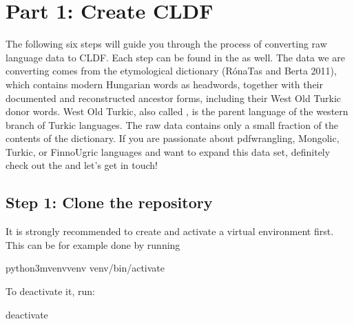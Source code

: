 \documentclass[letterpaper,10pt,english]{sphinxmanual}
\begin{document}
\chapter{Part 1: Create CLDF}
\label{\detokenize{mkcldf:part-1-create-cldf}}\label{\detokenize{mkcldf::doc}}
\sphinxAtStartPar
The following six steps will guide you through the process of
converting raw language data to CLDF. Each step can be found in the
as well. The data we are converting comes from the etymological dictionary
(Róna\sphinxhyphen{}Tas and Berta 2011),
which contains modern Hungarian words as headwords, together with their
documented and reconstructed ancestor forms, including their
West Old Turkic donor words. West Old Turkic, also called , is the parent
language of the western branch
of Turkic languages. The raw data contains only a small fraction of the
contents of the dictionary. If you are passionate about pdf\sphinxhyphen{}wrangling,
Mongolic, Turkic, or Finno\sphinxhyphen{}Ugric languages and want to expand this data set,
definitely check out the 
and let’s get in touch!


\section{Step 1: Clone the repository}
\label{\detokenize{mkcldf:step-1-clone-the-repository}}
\sphinxAtStartPar
It is strongly recommended to create and activate a virtual environment first.
This can be for example done by running

\begin{sphinxVerbatim}[commandchars=\\\{\}]
python3\PYGZhy{}mvenvvenv
venv/bin/activate
\end{sphinxVerbatim}

\sphinxAtStartPar
To deactivate it, run:

\begin{sphinxVerbatim}[commandchars=\\\{\}]
deactivate
\end{sphinxVerbatim}
\end{document}
